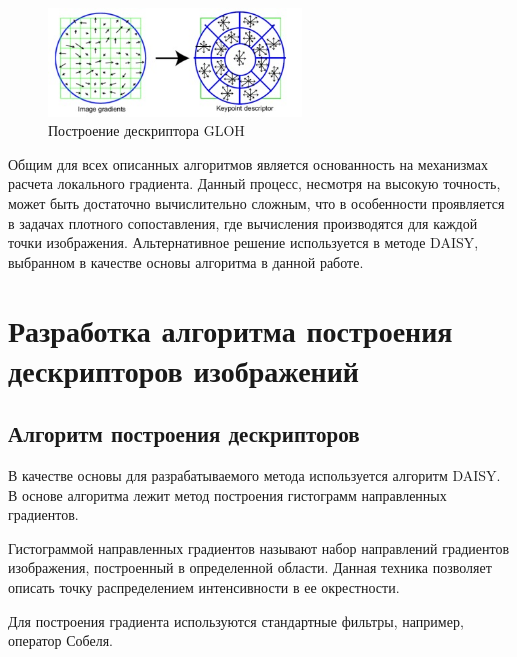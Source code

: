 {{{{	\begin{figure}[H]
		\centering                             
		\includegraphics[width=0.6\textwidth,keepaspectratio]{daisy/GLOH.jpg}       
		\centering\caption{ Построение дескриптора GLOH }
		\label{gradient_example}                           
	\end{figure} 

	Общим для всех описанных алгоритмов является основанность на механизмах расчета локального градиента. Данный процесс, несмотря на высокую точность, может быть достаточно вычислительно сложным, что в особенности проявляется в задачах плотного сопоставления, где вычисления производятся для каждой точки изображения. Альтернативное решение используется в методе DAISY, выбранном в качестве основы алгоритма в данной работе. 
	
}

\newpage

\section{Разработка алгоритма построения дескрипторов изображений}
{
	\subsection{Алгоритм построения дескрипторов}
	{
		В качестве основы для разрабатываемого метода используется алгоритм DAISY.
		В основе алгоритма лежит метод построения гистограмм направленных градиентов. 
		
		Гистограммой направленных градиентов называют набор направлений градиентов изображения, построенный в определенной области. Данная техника позволяет описать точку распределением интенсивности в ее окрестности.
		
		Для построения градиента используются стандартные фильтры, например, оператор Собеля. 
		
}}}}}
